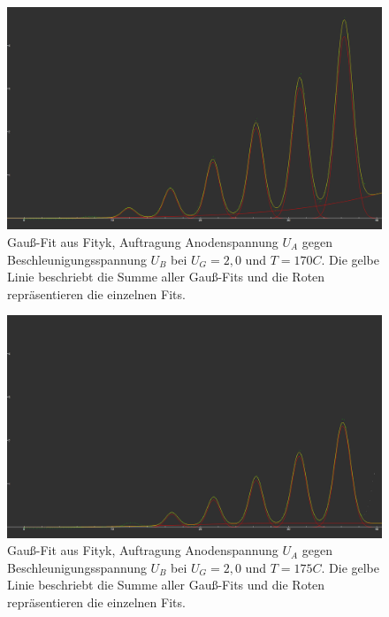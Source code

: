 \documentclass{article}
\begin{document}
\begin{figure}[H]
  \centering
  \includegraphics[scale=0.2]{FH_2,7V_170C.png}
  \caption{Gauß-Fit aus Fityk, Auftragung Anodenspannung $U_A$ gegen Beschleunigungsspannung $U_B$ bei $U_G=2,0$ und $T=170C$. Die gelbe
  Linie beschriebt die Summe aller Gauß-Fits und die Roten repräsentieren die einzelnen Fits.}
  \label{FH 2,0V_170C}
\end{figure}
\begin{figure}[H]
  \centering
  \includegraphics[scale=0.2]{FH_2,7V_175C.png}
  \caption{Gauß-Fit aus Fityk, Auftragung Anodenspannung $U_A$ gegen Beschleunigungsspannung $U_B$ bei $U_G=2,0$ und $T=175C$. Die gelbe
  Linie beschriebt die Summe aller Gauß-Fits und die Roten repräsentieren die einzelnen Fits.}
  \label{FH 2,0V_175C}
\end{figure}
\end{document}

